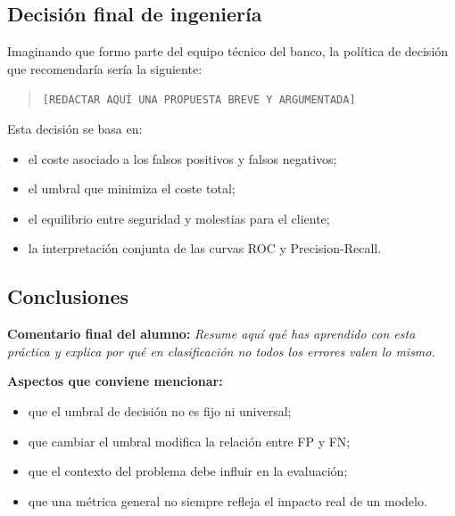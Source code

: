 \subsection{Decisión final de ingeniería}

Imaginando que formo parte del equipo técnico del banco, la política de decisión que recomendaría sería la siguiente:

\begin{quote}
\texttt{[REDACTAR AQUÍ UNA PROPUESTA BREVE Y ARGUMENTADA]}
\end{quote}

\noindent Esta decisión se basa en:
\begin{itemize}
    \item el coste asociado a los falsos positivos y falsos negativos;
    \item el umbral que minimiza el coste total;
    \item el equilibrio entre seguridad y molestias para el cliente;
    \item la interpretación conjunta de las curvas ROC y Precision-Recall.
\end{itemize}

\subsection{Conclusiones}

\textbf{Comentario final del alumno:}  
\textit{Resume aquí qué has aprendido con esta práctica y explica por qué en clasificación no todos los errores valen lo mismo.}

\vspace{0.3cm}
\noindent\textbf{Aspectos que conviene mencionar:}
\begin{itemize}
    \item que el umbral de decisión no es fijo ni universal;
    \item que cambiar el umbral modifica la relación entre FP y FN;
    \item que el contexto del problema debe influir en la evaluación;
    \item que una métrica general no siempre refleja el impacto real de un modelo.
\end{itemize}
